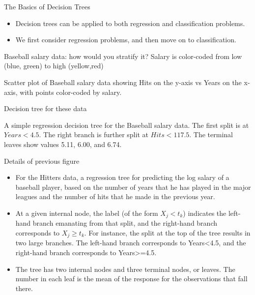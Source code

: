 \documentclass[aspectratio=169, 11pt]{beamer}
\begin{document}
\begin{frame}{The Basics of Decision Trees}
\begin{itemize}
    \item Decision trees can be applied to both regression and classification problems.
    \item We first consider regression problems, and then move on to classification.
\end{itemize}
\end{frame}

\begin{frame}{Baseball salary data: how would you stratify it?}
Salary is color-coded from low (blue, green) to high (yellow,red)
\vspace{0.5cm}
\begin{tcolorbox}[colback=LightGray,title=Figure]
Scatter plot of Baseball salary data showing Hits on the y-axis vs Years on the x-axis, with points color-coded by salary.
\end{tcolorbox}
\end{frame}

\begin{frame}{Decision tree for these data}
\begin{tcolorbox}[colback=LightGray,title=Figure]
A simple regression decision tree for the Baseball salary data. The first split is at $Years < 4.5$. The right branch is further split at $Hits < 117.5$. The terminal leaves show values 5.11, 6.00, and 6.74.
\end{tcolorbox}
\end{frame}

\begin{frame}{Details of previous figure}
\begin{itemize}
    \item For the Hitters data, a regression tree for predicting the log salary of a baseball player, based on the number of years that he has played in the major leagues and the number of hits that he made in the previous year.
    \item At a given internal node, the label (of the form $X_{j}<t_{k}$) indicates the left-hand branch emanating from that split, and the right-hand branch corresponds to $X_{j}\ge t_{k}$. For instance, the split at the top of the tree results in two large branches. The left-hand branch corresponds to Years<4.5, and the right-hand branch corresponds to Years>=4.5.
    \item The tree has two internal nodes and three terminal nodes, or leaves. The number in each leaf is the mean of the response for the observations that fall there.
\end{itemize}
\end{frame}
\end{document}
